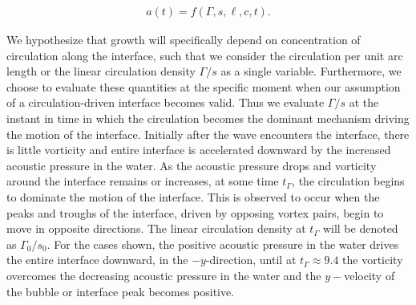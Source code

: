 \documentclass{jfm}%
\begin{document}
\begin{align}
  \label{eq:dimensional_amplitude}
  a(t)=f\left(\Gamma, s, \ell, c, t\right).
\end{align}

We hypothesize that growth will specifically depend on concentration
of circulation along the interface, such that we consider the
circulation per unit arc length or the linear circulation density
$\Gamma/s$ as a single variable. Furthermore, we choose to evaluate
these quantities at the specific moment when our assumption of a
circulation-driven interface becomes valid. Thus we evaluate
$\Gamma/s$ at the instant in time in which the circulation becomes the
dominant mechanism driving the motion of the interface. Initially
after the wave encounters the interface, there is little vorticity and
entire interface is accelerated downward by the increased acoustic
pressure in the water. As the acoustic pressure drops and vorticity
around the interface remains or increases, at some time $t_\Gamma$,
the circulation begins to dominate the motion of the interface. This
is observed to occur when the peaks and troughs of the interface,
driven by opposing vortex pairs, begin to move in opposite
directions. The linear circulation density at $t_\Gamma$ will be
denoted as $\Gamma_0/s_0$. For the cases shown, the positive acoustic
pressure in the water drives the entire interface downward, in the
$-y$-direction, until at $t_\Gamma\approx9.4$ the vorticity overcomes
the decreasing acoustic pressure in the water and the $y-$velocity of
the bubble or interface peak becomes positive.
\end{document}

